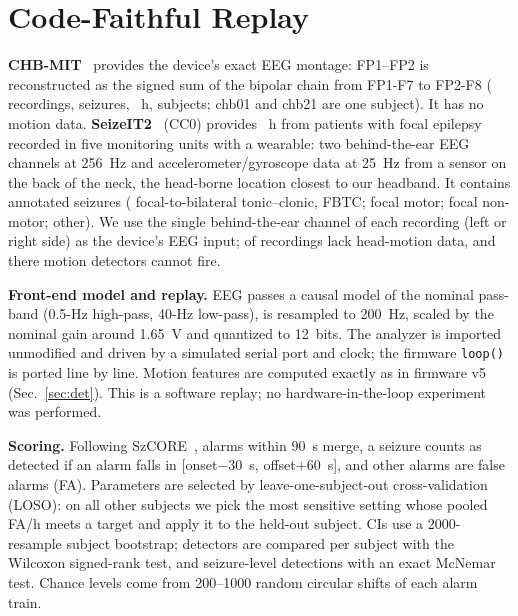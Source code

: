 \documentclass[conference,letterpaper]{IEEEtran}
\begin{document}
\section{Code-Faithful Replay}\label{sec:method}
\textbf{CHB-MIT}~\cite{shoeb2009thesis,goldberger2000physionet} provides the device's exact EEG montage: FP1--FP2 is reconstructed as the signed sum of the bipolar chain from FP1-F7 to FP2-F8 (\NRec{} recordings, \NSz{} seizures, \NHours{}~h, \NSubj{} subjects; chb01 and chb21 are one subject). It has no motion data.
\textbf{SeizeIT2}~\cite{bhagubai2025seizeit2} (CC0) provides \SHours{}~h from \SNSubj{} patients with focal epilepsy recorded in five monitoring units with a wearable: two behind-the-ear EEG channels at 256~Hz and accelerometer/gyroscope data at 25~Hz from a sensor on the back of the neck, the head-borne location closest to our headband. It contains \SNSz{} annotated seizures (\SNFBTC{} focal-to-bilateral tonic--clonic, FBTC; \SNMotor{} focal motor; \SNNonMotor{} focal non-motor; \SNOther{} other). We use the single behind-the-ear channel of each recording (left or right side) as the device's EEG input; \SMovMissing{} of \SNRuns{} recordings lack head-motion data, and there motion detectors cannot fire.

\textbf{Front-end model and replay.} EEG passes a causal model of the nominal pass-band (0.5-Hz high-pass, 40-Hz low-pass), is resampled to 200~Hz, scaled by the nominal gain around 1.65~V and quantized to 12~bits. The analyzer is imported unmodified and driven by a simulated serial port and clock; the firmware \texttt{loop()} is ported line by line. Motion features are computed exactly as in firmware v5 (Sec.~\ref{sec:det}). This is a software replay; no hardware-in-the-loop experiment was performed.

\textbf{Scoring.} Following SzCORE~\cite{dan2025szcore}, alarms within 90~s merge, a seizure counts as detected if an alarm falls in [onset$-$30~s, offset$+$60~s], and other alarms are false alarms (FA). Parameters are selected by leave-one-subject-out cross-validation (LOSO): on all other subjects we pick the most sensitive setting whose pooled FA/h meets a target and apply it to the held-out subject. CIs use a 2000-resample subject bootstrap; detectors are compared per subject with the Wilcoxon signed-rank test, and seizure-level detections with an exact McNemar test. Chance levels come from 200--1000 random circular shifts of each alarm train.
\end{document}
